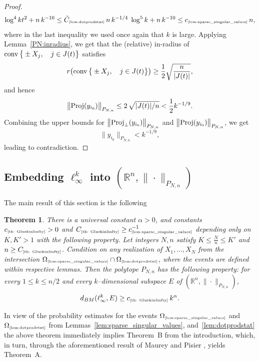 \documentclass[11pt]{amsart}
\newtheorem{theorem}{Theorem}[section]
\theoremstyle{definition}
\theoremstyle{plain}
\newcommand{\R}{\mathbb{R}}
\def\R{{\mathbb R}}
\def\Proj{{\rm Proj}}
\def\conv{{\rm conv}}
\newcommand{\tref}[1]{\text{\tiny{\ref{#1}}}}
\begin{document}
\begin{proof}
$${\log^{4} k }{t^2}
+n\,k^{-10}\leq 
\tilde C_{\text{\tiny\ref{lem:dotprodstat}}}\,
n\,k^{-1/4}\;
\log^{5} k
+n\,k^{-10}\leq c_{\tref{lem:sparse_singular_values}}\,n,
$$
where in the last inequality we used once again that $k$ is large.
Applying Lemma~\ref{PN:inradius}, we get that the (relative) in-radius
of $\conv\,\big\{\pm X_j,\quad j\in J(t)\big\}$ satisfies
$$
r\big(\conv\,\big\{\pm X_j,\quad j\in J(t)\big\}\big)
\geq
\frac{1}{2}\sqrt{\frac{n}{|J(t)|}},
$$
and hence
$$
\big\|\Proj(y_{i_0})\big\|_{P_{N,n}}
\leq 2\,\sqrt{|J(t)|/n}<\frac{1}{2}k^{-1/9}.
$$
Combining the upper bounds for $\big\|\Proj_\perp(y_{i_0})\big\|_{P_{N,n}}$
and $\big\|\Proj(y_{i_0})\big\|_{P_{N,n}}$, we get
$$
\|y_{i_0}\|_{P_{N,n}}< k^{-1/9},
$$
leading to contradiction.
\end{proof}











\subsection{Embedding $\ell_\infty^k$ into $(\R^n,\|\cdot\|_{P_{N,n}})$}

The main result of this section is the following

\begin{theorem}\label{th: Gluskinlinfty}
There is a universal constant $\alpha>0$,
and constants $c_{\text{\tiny\ref{th: Gluskinlinfty}}}>0$
and $C_{\text{\tiny\ref{th: Gluskinlinfty}}}
\geq c_{\text{\tiny\ref{lem:sparse_singular_values}}}^{-1}$
depending only on $K,K'>1$ with the following property.
Let integers $N,n$
satisfy $K\leq \frac{N}{n}\leq K'$ and $n\geq
C_{\text{\tiny\ref{th: Gluskinlinfty}}}$.
Condition on any realization of $X_1,\dots,X_N$
from the intersection
$\Omega_{\text{\tiny\ref{lem:sparse_singular_values}}}
\cap \Omega_{\text{\tiny\ref{lem:dotprodstat}}}
$,
where the events are defined within respective lemmas.
Then
the polytope $P_{N,n}$ has the following property:
for every $1\leq k\leq n/2$ and every $k$--dimensional
subspace $E$ of $(\R^n,\|\cdot\|_{P_{N,n}})$,
$$
d_{BM}(\ell_\infty^k,E)
\geq c_{\text{\tiny\ref{th: Gluskinlinfty}}}\,k^\alpha.
$$
\end{theorem}
In view of the probability estimates for the events
$\Omega_{\text{\tiny\ref{lem:sparse_singular_values}}}$ and
$\Omega_{\text{\tiny\ref{lem:dotprodstat}}}$
from Lemmas~\ref{lem:sparse_singular_values}, and~\ref{lem:dotprodstat}
the above theorem immediately implies Theorem~B from the introduction, which, in turn,
through the aforementioned result of Maurey and Pisier \cite{MP76}, yields Theorem~A.
\end{document}
